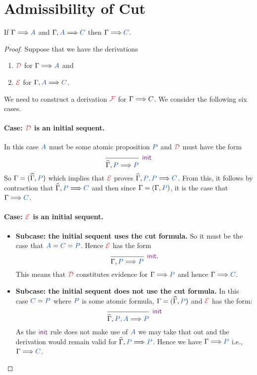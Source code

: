 \section{Admissibility of Cut}

\begin{theorem}[Cut]
  If $\sequent{A}$ and $\sequent[A]{C}$ then $\sequent{C}$.
\end{theorem}
\begin{proof}
  Suppose that we have the derivations
  \begin{enumerate}
    \item $\drv{D}$ for $\sequent{A}$ and
    \item $\drv{E}$ for $\sequent[A]{C}$.
  \end{enumerate}
  We need to construct a derivation $\drv{F}$ for $\sequent{}{C}$.
  We consider the following six cases.

  \paragraph{Case: $\drv{D}$ is an initial sequent.} In this case
  $\prp{A}$ must be some atomic proposition $\prp{P}$ and $\drv{D}$
  must have the form
  \[
      \begin{prooftree}
        \infer0[$\initRule$]{\sequentHat[P]{P}}
      \end{prooftree}
  \]
  So $\Gamma = (\widehat{\Gamma}, \prp{P})$ which implies that $\drv{E}$ proves
  $\sequentHat[\prp{P}, \prp{P}]{C}$. From this, it follows by contraction
  that $\sequentHat[\prp{P}]{C}$ and then since $\Gamma = (\Gamma, \prp{P})$,
  it is the case that $\sequent{\prp{C}}$.

  \paragraph{Case: $\drv{E}$ is an initial sequent.}

  \begin{itemize}
    \item \textbf{Subcase: the initial sequent uses the cut formula.} So it
    must be the case that $\prp{A} = \prp{C} = \prp{P}$. Hence $\drv{E}$ has
    the form
    \[
      \begin{prooftree}
        \infer0[$\initRule$.]{\sequent[P]{P}}
      \end{prooftree}
    \]
    This means that $\drv{D}$ constitutes evidence for $\sequent{P}$ and hence
    $\sequent{C}$.

    \item \textbf{Subcase: the initial sequent does not use the cut formula.}
    In this case $\prp{C} = \prp{P}$ where $\prp{P}$ is some atomic formula,
    $\Gamma = (\widehat{\Gamma}, \prp{P})$ and $\drv{E}$ has the form:
    \[
      \begin{prooftree}
        \infer0[$\initRule$]{\sequentHat[\prp{P}, \prp{A}]{\prp{P}}}
      \end{prooftree}
    \]
    As the $\initRule$ rule does not make use of $\prp{A}$ we may take that out
    and the derivation would remain valid for $\sequentHat[\prp{P}]{\prp{P}}$.
    Hence we have $\sequent{\prp{P}}$ i.e., $\sequent{\prp{C}}$.
  \end{itemize}


\end{proof}
